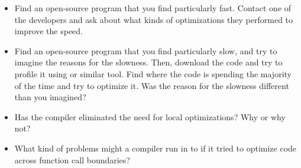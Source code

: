 \begin{itemize}\item Find an open-source program that you find particularly fast.  Contact one of the developers and ask about what kinds of optimizations they performed to improve the speed. 
\item Find an open-source program that you find particularly slow, and try to imagine the reasons for the slowness.  Then, download the code and try to profile it using  or similar tool.  Find where the code is spending the majority of the time and try to optimize it.  Was the reason for the slowness different than you imagined? 
\item Has the compiler eliminated the need for local optimizations?  Why or why not? 
\item What kind of problems might a compiler run in to if it tried to optimize code across function call boundaries? 
\end{itemize}


